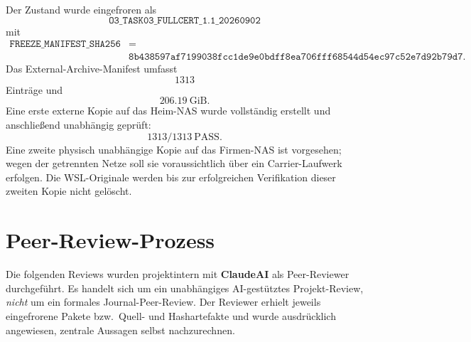 \documentclass[11pt,a4paper]{article}
\newcommand{\code}[1]{\texttt{#1}}
\begin{document}
Der Zustand wurde eingefroren als
\[
\code{O3\_TASK03\_FULLCERT\_1.1\_20260902}
\]
mit
\[
\begin{aligned}
\code{FREEZE\_MANIFEST\_SHA256}&={}\\[-1mm]
&\code{8b438597af7199038fcc1de9e0bdff8ea706fff68544d54ec97c52e7d92b79d7}.
\end{aligned}
\]
Das External-Archive-Manifest umfasst
\[
1313
\]
Einträge und
\[
206.19\ \mathrm{GiB}.
\]
Eine erste externe Kopie auf das Heim-NAS wurde vollständig erstellt und anschließend unabhängig geprüft:
\[
\boxed{1313/1313\ \mathrm{PASS}.}
\]
Eine zweite physisch unabhängige Kopie auf das Firmen-NAS ist vorgesehen; wegen der getrennten Netze soll sie voraussichtlich über ein Carrier-Laufwerk erfolgen. Die WSL-Originale werden bis zur erfolgreichen Verifikation dieser zweiten Kopie nicht gelöscht.

\section{Peer-Review-Prozess}

Die folgenden Reviews wurden projektintern mit \textbf{ClaudeAI} als Peer-Reviewer durchgeführt. Es handelt sich um ein unabhängiges AI-gestütztes Projekt-Review, \emph{nicht} um ein formales Journal-Peer-Review. Der Reviewer erhielt jeweils eingefrorene Pakete bzw.\ Quell- und Hashartefakte und wurde ausdrücklich angewiesen, zentrale Aussagen selbst nachzurechnen.
\end{document}
